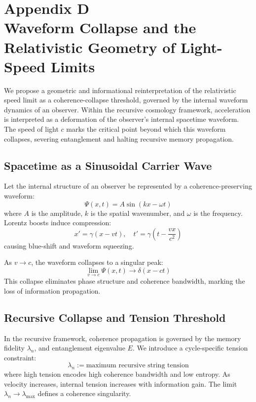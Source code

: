 \section*{Appendix D\\Waveform Collapse and the Relativistic Geometry of Light-Speed Limits}
\label{appendix:D}

We propose a geometric and informational reinterpretation of the relativistic speed limit as a coherence-collapse threshold, governed by the internal waveform dynamics of an observer. Within the recursive cosmology framework, acceleration is interpreted as a deformation of the observer’s internal spacetime waveform. The speed of light \( c \) marks the critical point beyond which this waveform collapses, severing entanglement and halting recursive memory propagation.

\subsection*{Spacetime as a Sinusoidal Carrier Wave}

Let the internal structure of an observer be represented by a coherence-preserving waveform:
\[
\Psi(x,t) = A \sin(kx - \omega t)
\]
where \( A \) is the amplitude, \( k \) is the spatial wavenumber, and \( \omega \) is the frequency. Lorentz boosts induce compression:
\[
x' = \gamma(x - vt), \quad t' = \gamma\left(t - \frac{vx}{c^2}\right)
\]
causing blue-shift and waveform squeezing.

As \( v \to c \), the waveform collapses to a singular peak:
\[
\lim_{v \to c} \Psi(x,t) \to \delta(x - ct)
\]
This collapse eliminates phase structure and coherence bandwidth, marking the loss of information propagation.

\subsection*{Recursive Collapse and Tension Threshold}

In the recursive framework, coherence propagation is governed by the memory fidelity \( \lambda_n \), and entanglement eigenvalue \( E \). We introduce a cycle-specific tension constraint:
\[
\lambda_n := \text{maximum recursive string tension}
\]
where high tension encodes high coherence bandwidth and low entropy. As velocity increases, internal tension increases with information gain. The limit \( \lambda_n \to \lambda_{\text{max}} \) defines a coherence singularity.

